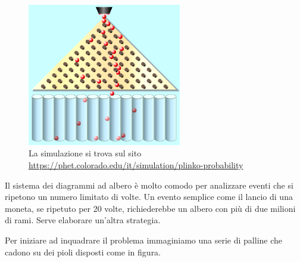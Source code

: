 \begin{figure}
  \begin{center}
    \includegraphics[width=0.6\textwidth]{img/griglia.png}
  \end{center}
  \caption{La simulazione si trova sul sito 
\href{https://phet.colorado.edu/it/simulation/plinko-probability}
     {https://phet.colorado.edu/it/simulation/plinko-probability}}
\end{figure}

Il sistema dei diagrammi ad albero è molto comodo per analizzare eventi che 
si ripetono un numero limitato di volte. Un evento semplice come il lancio 
di 
una moneta, se ripetuto per 20 volte, richiederebbe un albero con più di 
due 
milioni di rami. Serve elaborare un'altra strategia. 

Per iniziare ad inquadrare il problema immaginiamo una serie di palline che 
cadono su dei pioli disposti come in figura. 

